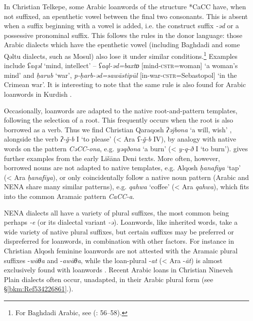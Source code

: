 \documentclass[output=paper]{langsci/langscibook}
\begin{document}
In Christian Telkepe, some Arabic loanwords of the structure *CaCC have, when not suffixed, an epenthetic vowel between the final two consonants. This is absent when a suffix beginning with a vowel is added, i.e. the construct suffix \textit{{}-əd} or a possessive pronominal suffix. This follows the rules in the donor language: those Arabic dialects which have the epenthetic vowel (including Baghdadi and some Qəltu dialects, such as Mosul) also lose it under similar conditions.\footnote{For Baghdadi Arabic, see (\citealt{Erwin1964}: 56–58).} Examples include \textit{ʕaqəl} ‘mind, intellect’ – \textit{ʕaql-əd=baxtɒ} [mind-\textsc{cstr}=woman] ‘a woman’s mind’ and \textit{ḥarub} ‘war’, \textit{p\nobreakdash-ḥarb\nobreakdash-əd=sawāstipūl} [in-war-\textsc{cstr}=Sebastopol] ‘in the Crimean war’. It is interesting to note that the same rule is also found for Arabic loanwords in Kurdish \citep[5]{Thackston2006}.

Occasionally, loanwords are adapted to the native root-and-pattern templates, following the selection of a root. This frequently occurs when the root is also borrowed as a verb. Thus we find Christian Qaraqosh \textit{ʔəjbona} ‘a will, wish’ \citep[517]{Khan2002}, alongside the verb \textit{ʔ-ǧ{}-b} I ‘to please’ (< Ara \textit{ʕ-ǧ{}-b} IV), by analogy with native words on the pattern \textit{CəCC\nobreakdash-ona}, e.g. \textit{yəqðona} ‘a burn’ (< \textit{y-q-ð} I ‘to burn’). \citep[205]{Sabar1984} gives further examples from the early Lišāna Deni texts. More often, however, borrowed nouns are not adapted to native templates, e.g. Alqosh \textit{ḥanafiya} ‘tap’ (< Ara \textit{ḥanafīya}), or only coincidentally follow a native noun pattern (Arabic and NENA share many similar patterns), e.g. \textit{qahwa} ‘coffee’ (< Ara \textit{qahwa}), which fits into the common Aramaic pattern \textit{CaCC\nobreakdash-a}.

NENA dialects all have a variety of plural suffixes, the most common being perhaps \textit{\nobreakdash-e} (or its dialectal variant \textit{\nobreakdash-ə}). Loanwords, like inherited words, take a wide variety of native plural suffixes, but certain suffixes may be preferred or dispreferred for loanwords, in combination with other factors. For instance in Christian Alqosh feminine loanwords are not attested with the Aramaic plural suffixes \nobreakdash-\textit{wāθa} and \nobreakdash-\textit{awāθa}, while the loan-plural \nobreakdash-\textit{at} (< Ara \nobreakdash-\textit{āt}) is almost exclusively found with loanwords \citep[347]{Coghill2005}. Recent Arabic loans in Christian Nineveh Plain dialects often occur, unadapted, in their Arabic plural form (see §\ref{bkm:Ref534226861}.).
\end{document}
